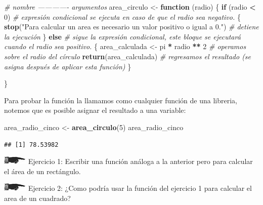 \documentclass[]{book}
\newenvironment{Shaded}{\begin{snugshade}}{\end{snugshade}}
\newcommand{\KeywordTok}[1]{\textcolor[rgb]{0.13,0.29,0.53}{\textbf{#1}}}
\newcommand{\DecValTok}[1]{\textcolor[rgb]{0.00,0.00,0.81}{#1}}
\newcommand{\StringTok}[1]{\textcolor[rgb]{0.31,0.60,0.02}{#1}}
\newcommand{\CommentTok}[1]{\textcolor[rgb]{0.56,0.35,0.01}{\textit{#1}}}
\newcommand{\ControlFlowTok}[1]{\textcolor[rgb]{0.13,0.29,0.53}{\textbf{#1}}}
\newcommand{\OperatorTok}[1]{\textcolor[rgb]{0.81,0.36,0.00}{\textbf{#1}}}
\newcommand{\NormalTok}[1]{#1}
\theoremstyle{definition}
\theoremstyle{definition}
\theoremstyle{definition}
\theoremstyle{remark}
\begin{document}
\begin{Shaded}
\begin{Highlighting}[]
\CommentTok{# nombre ------------- argumentos}
\NormalTok{area_circulo <-}\StringTok{ }\ControlFlowTok{function}\NormalTok{ (radio) \{}
  \ControlFlowTok{if}\NormalTok{ (radio }\OperatorTok{<}\StringTok{ }\DecValTok{0}\NormalTok{) }\CommentTok{# expresión condicional se ejecuta en caso de que el radio sea negativo.}
\NormalTok{  \{}
    \KeywordTok{stop}\NormalTok{(}\StringTok{"Para calcular un area es necesario un valor positivo o igual a 0."}\NormalTok{) }\CommentTok{# detiene la ejecución}
\NormalTok{  \} }\ControlFlowTok{else} \CommentTok{# sigue la expresión condicional, este bloque se ejecutará cuando el radio sea positivo.}
\NormalTok{  \{}
\NormalTok{    area_calculada <-}\StringTok{ }\NormalTok{pi }\OperatorTok{*}\StringTok{ }\NormalTok{radio }\OperatorTok{**}\StringTok{ }\DecValTok{2} \CommentTok{# operamos sobre el radio del círculo}
    \KeywordTok{return}\NormalTok{(area_calculada) }\CommentTok{# regresamos el resultado (se asigna después de aplicar esta función)}
\NormalTok{  \}}
  
\NormalTok{\}}
\end{Highlighting}
\end{Shaded}

Para probar la función la llamamos como cualquier función de una
libreria, notemos que es posible asignar el resultado a una variable:

\begin{Shaded}
\begin{Highlighting}[]
\NormalTok{area_radio_cinco <-}\StringTok{ }\KeywordTok{area_circulo}\NormalTok{(}\DecValTok{5}\NormalTok{)}
\NormalTok{area_radio_cinco}
\end{Highlighting}
\end{Shaded}

\begin{verbatim}
## [1] 78.53982
\end{verbatim}

\includegraphics{./imagenes/manicule2.jpg} Ejercicio 1: Escribir una
función análoga a la anterior pero para calcular el área de un
rectángulo.

\includegraphics{./imagenes/manicule2.jpg} Ejercicio 2: ¿Como podría
usar la función del ejercicio 1 para calcular el area de un cuadrado?
\end{document}
